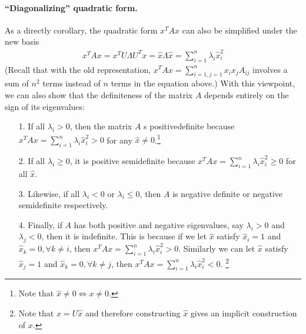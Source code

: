\documentclass[12pt]{article}
\begin{document}
\paragraph{``Diagonalizing'' quadratic form.} As a directly corollary, the quadratic form $x^TAx$ can also be simplified under the new basis
\begin{align}
x^TAx = x^TU\Lambda U^T x = \hat{x} \Lambda \hat{x} = \sum_{i=1}^n \lambda_i\hat{x}_i^2 \label{eqn:diag-quadratic}
\end{align}
(Recall that with the old representation, $x^TAx = \sum_{i=1,j=1}^{n} x_ix_jA_{ij}$ involves a sum of $n^2$ terms instead of $n$ terms in the equation above.) With this viewpoint,  we can also show that the definiteness of the matrix $A$ depends
entirely on the sign of its eigenvalues:
\begin{itemize}
	\item[1.]   If all $\lambda_i > 0$, then the matrix $A$ s positivedefinite because $x^TAx = \sum_{i=1}^n \lambda_i\hat{x}_i^2 > 0$ for any $\hat{x}\neq 0$.\footnote{Note that $\hat{x}\neq 0\Leftrightarrow x\neq 0$.} 
	\item[2.]  If all $\lambda_i \geq 0$, it is positive semidefinite because $x^TAx = \sum_{i=1}^n \lambda_i\hat{x}_i^2 \ge  0$ for all $\hat{x}$. 
	\item[3.]  Likewise, if all $\lambda_i < 0$ or $\lambda_i \leq 0$, then $A$ is
	negative definite or negative semidefinite respectively.  
	\item[4.] Finally, if
	$A$ has both positive and negative eigenvalues, say $\lambda_i > 0$ and $\lambda_j < 0$, then it is indefinite. This is because if we let $\hat{x}$ satisfy $\hat{x}_i = 1 $ and $\hat{x}_k =0, \forall k\neq i$, then $x^TAx = \sum_{i=1}^n \lambda_i\hat{x}_i^2 > 0$. Similarly we can let $\hat{x}$ satisfy $\hat{x}_j = 1 $ and $\hat{x}_k =0, \forall k\neq j$, then $x^TAx = \sum_{i=1}^n \lambda_i\hat{x}_i^2  < 0$. \footnote{Note that $x = U\hat{x}$ and therefore constructing $\hat{x}$ gives an implicit construction of $x$. }
\end{itemize}
%
\end{document}
